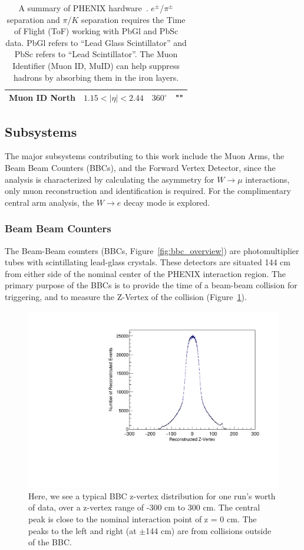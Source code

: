 \begin{table}
\begin{tabular}{l c c p{5cm}}
    Muon ID North & $1.15 < \vert\eta\vert < 2.44$   & $360^{\circ}$ & "" \\
    \bottomrule 
  \end{tabular}
  \caption{
    A summary of PHENIX hardware~\cite{Adcox2003}. $e^\pm$/$\pi^\pm$ separation
    and $\pi$/$K$ separation requires the Time of Flight (ToF) working with
    PbGl and PbSc data. PbGl refers to ``Lead Glass Scintillator'' and PbSc
    refers to ``Lead Scintillator''. The Muon Identifier (Muon ID, MuID) can
    help suppress hadrons by absorbing them in the iron layers. 
  }
  \label{tab:phenix_detector_summary}
\end{table}

\clearpage

\subsection{Subsystems}
\label{sec:subsystems}

The major subsystems contributing to this work include the Muon Arms, the Beam
Beam Counters (BBCs), and the Forward Vertex Detector, since the analysis is
characterized by calculating the asymmetry for $W\rightarrow\mu$ interactions,
only muon reconstruction and identification is required. For the complimentary
central arm analysis, the $W\rightarrow e$ decay mode is explored.

\subsubsection{Beam Beam Counters}

The Beam-Beam counters (BBCs, Figure~\ref{fig:bbc_overview}) are
photomultiplier tubes with scintillating lead-glass crystals. These detectors
are situated 144 cm from either side of the nominal center of the PHENIX
interaction region. The primary purpose of the BBCs is to provide the time of a
beam-beam collision for triggering, and to measure the Z-Vertex of the
collision (Figure~\ref{fig:bbc_zvertex_example}).

\begin{figure}[ht]
  \centering
  \includegraphics[width=0.7\linewidth]{./figures/bbc_zvertex}
  \caption{
    Here, we see a typical BBC z-vertex distribution for one run's worth of
    data, over a z-vertex range of -300 cm to 300 cm. The central peak is close
    to the nominal interaction point of z = 0 cm. The peaks to the left and
    right (at $\pm$144 cm) are from collisions outside of the BBC.
  }
  \label{fig:bbc_zvertex_example}
\end{figure}

